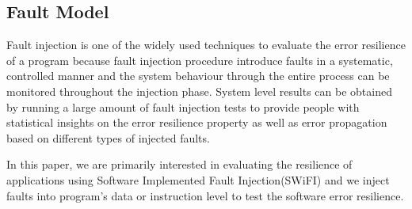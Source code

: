 \subsection{Fault Model}

Fault injection is one of the widely used techniques to evaluate the error resilience of a program because fault injection procedure introduce faults in a systematic, controlled manner and the system behaviour through the entire process can be monitored throughout the injection phase. System level results can be obtained by running a large amount of fault injection tests to provide people with statistical insights on the error resilience property as well as error propagation based on different types of injected faults.

In this paper, we are primarily interested in evaluating the resilience of applications using Software Implemented Fault Injection(SWiFI) and we inject faults into program's data or instruction level to test the software error resilience.





